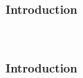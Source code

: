 
\begin{frame}[t]
	\frametitle{Introduction}
	\framesubtitle{~~}  %

\end{frame}
\begin{frame}[t]
	\frametitle{Introduction}
	\framesubtitle{~~}  %

\end{frame}


